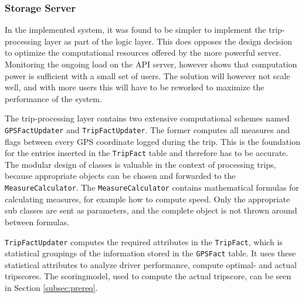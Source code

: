 \subsubsection{Storage Server}\label{subsec:impl_storage_server}
In the implemented system, it was found to be simpler to implement the trip-processing layer as part of the logic layer. This does opposes the design decision to optimize the computational resources offered by the more powerful server. Monitoring the ongoing load on the API server, however shows that computation power is sufficient with a small set of users. The solution will however not scale well, and with more users this will have to be reworked to maximize the performance of the system. 

The trip-processing layer contains two extensive computational schemes named \texttt{GPSFactUpdater} and \texttt{TripFactUpdater}. The former computes all measures and flags between every GPS coordinate logged during the trip. This is the foundation for the entries inserted in the \texttt{TripFact} table and therefore has to be accurate. The modular design of classes is valuable in the context of processing trips, because appropriate objects can be chosen and forwarded to the \texttt{MeasureCalculator}. The \texttt{MeasureCalculator} contains mathematical formulas for calculating measures, for example how to compute speed. Only the appropriate sub classes are sent as parameters, and the complete object is not thrown around between formulas. 

\texttt{TripFactUpdater} computes the required attributes in the \texttt{TripFact}, which is statistical groupings of the information stored in the \texttt{GPSFact} table. It uses these statistical attributes to analyze driver performance, compute optimal- and actual tripscores. The scoringmodel, used to compute the actual tripscore, can be seen in Section \ref{subsec:prereq}.